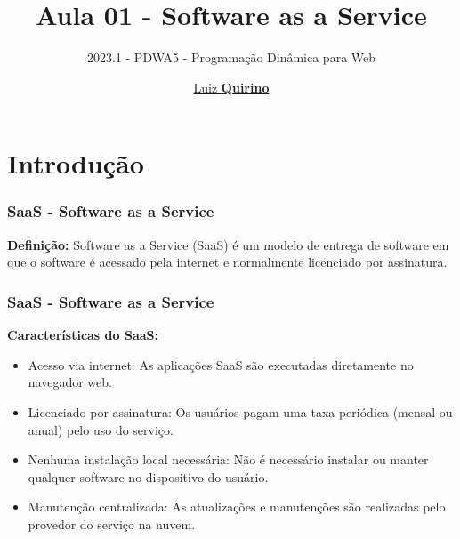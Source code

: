 \documentclass{beamer}
\title{Aula 01 - Software as a Service}
\subtitle{2023.1 - PDWA5 - Programação Dinâmica para Web}
\author{\href{mailto:luiz.quirino@ifsp.edu.br}{Luiz \textbf{Quirino}}}
\newcommand{\hrefcol}[2]{\textcolor{cyan}{\href{#1}{#2}}}
\begin{document}
\maketitle

%
%


\section{Introdução}
\begin{frame}
	\frametitle{SaaS - Software as a Service}

	\textbf{Definição:} Software as a Service (SaaS) é um modelo de entrega de software em que o software é acessado pela internet e normalmente licenciado por assinatura.




\end{frame}
\begin{frame}
	\frametitle{SaaS - Software as a Service}

	\textbf{Características do SaaS:}
	\begin{itemize}
		\item Acesso via internet: As aplicações SaaS são executadas diretamente no navegador web.
		\item Licenciado por assinatura: Os usuários pagam uma taxa periódica (mensal ou anual) pelo uso do serviço.
		\item Nenhuma instalação local necessária: Não é necessário instalar ou manter qualquer software no dispositivo do usuário.
		\item Manutenção centralizada: As atualizações e manutenções são realizadas pelo provedor do serviço na nuvem.
	\end{itemize}


\end{frame}
\end{document}

